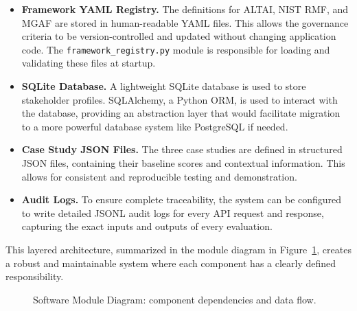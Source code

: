 \begin{itemize}[leftmargin=2em]
  \item \textbf{Framework YAML Registry.} The definitions for ALTAI, NIST RMF, and MGAF are stored in human-readable YAML files. This allows the governance criteria to be version-controlled and updated without changing application code. The \texttt{framework\_registry.py} module is responsible for loading and validating these files at startup.

  \item \textbf{SQLite Database.} A lightweight SQLite database is used to store stakeholder profiles. SQLAlchemy, a Python ORM, is used to interact with the database, providing an abstraction layer that would facilitate migration to a more powerful database system like PostgreSQL if needed.

  \item \textbf{Case Study JSON Files.} The three case studies are defined in structured JSON files, containing their baseline scores and contextual information. This allows for consistent and reproducible testing and demonstration.

  \item \textbf{Audit Logs.} To ensure complete traceability, the system can be configured to write detailed JSONL audit logs for every API request and response, capturing the exact inputs and outputs of every evaluation.
\end{itemize}

This layered architecture, summarized in the module diagram in Figure~\ref{fig:modules}, creates a robust and maintainable system where each component has a clearly defined responsibility.

\begin{figure}[H]
\centering
{}
\caption{Software Module Diagram: component dependencies and data flow.}
\label{fig:modules}
\end{figure}
